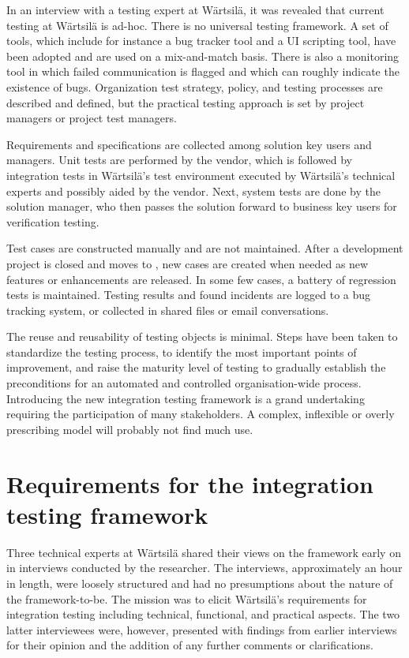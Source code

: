 \documentclass[12pt,a4paper,oneside,pdftex]{report}
\begin{document}
In an interview with a testing expert at Wärtsilä, it was revealed that current testing at Wärtsilä is ad-hoc. There is no universal testing framework. A set of tools, which include for instance a bug tracker tool and a UI scripting tool, have been adopted and are used on a mix-and-match basis. There is also a monitoring tool in which failed communication is flagged and which can roughly indicate the existence of bugs. Organization test strategy, policy, and testing processes are described and defined, but the practical testing approach is set by project managers or project test managers.

Requirements and specifications are collected among solution key users and managers. Unit tests are performed by the vendor, which is followed by integration tests in Wärtsilä's test environment executed by Wärtsilä's technical experts and possibly aided by the vendor. Next, system tests are done by the solution manager, who then passes the solution forward to business key users for verification testing. %

Test cases are constructed manually and are not maintained. After a development project is closed and moves to , new cases are created when needed as new features or enhancements are released. In some few cases, a battery of regression tests is maintained. Testing results and found incidents are logged to a bug tracking system, or collected in shared files or email conversations. 

The reuse and reusability of testing objects is minimal. Steps have been taken to standardize the testing process, to identify the most important points of improvement, and raise the maturity level of testing to gradually establish the preconditions for an automated and controlled organisation-wide process. Introducing the new integration testing framework is a grand undertaking requiring the participation of many stakeholders. A complex, inflexible or overly prescribing model will probably not find much use.


\section{Requirements for the integration testing framework}  

Three technical experts at Wärtsilä shared their views on the framework early on in interviews conducted by the researcher. The interviews, approximately an hour in length, were loosely structured and had no presumptions about the nature of the framework-to-be. The mission was to elicit Wärtsilä's requirements for integration testing including technical, functional, and practical aspects. The two latter interviewees were, however, presented with findings from earlier interviews for their opinion and the addition of any further comments or clarifications.
\end{document}
